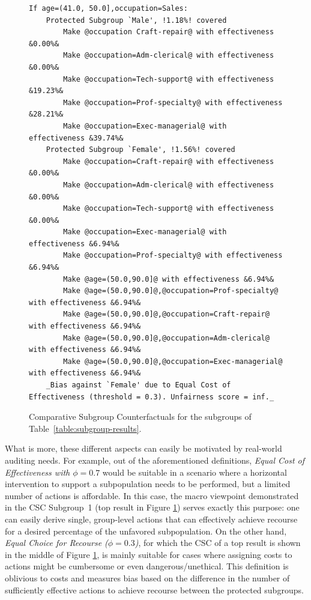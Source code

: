 \documentclass{article}
\begin{document}
\begin{figure}[ht]
\begin{minipage}{1\linewidth}
\begin{lstlisting}[style = base,escapechar=+]
If age=(41.0, 50.0],occupation=Sales:
    Protected Subgroup `Male', !1.18%! covered
        Make @occupation Craft-repair@ with effectiveness &0.00%&
        Make @occupation=Adm-clerical@ with effectiveness &0.00%&
        Make @occupation=Tech-support@ with effectiveness &19.23%&
        Make @occupation=Prof-specialty@ with effectiveness &28.21%&
        Make @occupation=Exec-managerial@ with effectiveness &39.74%&
    Protected Subgroup `Female', !1.56%! covered
        Make @occupation=Craft-repair@ with effectiveness &0.00%&
        Make @occupation=Adm-clerical@ with effectiveness &0.00%&
        Make @occupation=Tech-support@ with effectiveness &0.00%&
        Make @occupation=Exec-managerial@ with effectiveness &6.94%&
        Make @occupation=Prof-specialty@ with effectiveness &6.94%&
        Make @age=(50.0,90.0]@ with effectiveness &6.94%&
        Make @age=(50.0,90.0]@,@occupation=Prof-specialty@ with effectiveness &6.94%&
        Make @age=(50.0,90.0]@,@occupation=Craft-repair@ with effectiveness &6.94%&
        Make @age=(50.0,90.0]@,@occupation=Adm-clerical@ with effectiveness &6.94%&
        Make @age=(50.0,90.0]@,@occupation=Exec-managerial@ with effectiveness &6.94%&
    _Bias against `Female' due to Equal Cost of Effectiveness (threshold = 0.3). Unfairness score = inf._
\end{lstlisting}
\caption{Comparative Subgroup Counterfactuals for the subgroups of Table~\ref{table:subgroup-results}.}
\label{fig-subgroups}
\end{minipage}
\end{figure}

What is more, these different aspects can easily be motivated by real-world auditing needs. For example, out of the aforementioned definitions, \textit{Equal Cost of Effectiveness with $\phi=0.7$} would be suitable in a scenario where a horizontal intervention to support a subpopulation needs to be performed, but a limited number of actions is affordable. In this case, the macro viewpoint demonstrated in the CSC Subgroup~1 (top result in Figure \ref{fig-subgroups}) serves exactly this purpose: one can easily derive single, group-level actions that can effectively achieve recourse for a desired percentage of the unfavored subpopulation.
On the other hand, \textit{Equal Choice for Recourse ($\phi=0.3$)}, for which the CSC of a top result is shown in the middle of Figure \ref{fig-subgroups}, is mainly suitable for cases where assigning costs to actions might be cumbersome or even dangerous/unethical. This definition is oblivious to costs and measures bias based on the difference in the number of sufficiently effective actions to achieve recourse between the protected subgroups.
\end{document}

